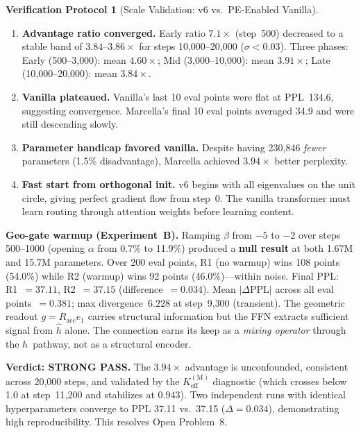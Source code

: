 \documentclass[11pt,a4paper]{article}
\theoremstyle{definition}
\newtheorem{protocol}[theorem]{Verification Protocol}
\theoremstyle{remark}
\begin{document}
\begin{protocol}[Scale Validation: v6 vs.\ PE-Enabled 
Vanilla]
\begin{enumerate}[label=(\roman*)]
    \item \textbf{Advantage ratio converged.} Early ratio $7.1\times$ 
    (step~500) decreased to a stable band of $3.84$--$3.86\times$ 
    for steps 10{,}000--20{,}000 ($\sigma < 0.03$). Three phases: 
    Early (500--3{,}000): mean $4.60\times$; Mid (3{,}000--10{,}000): 
    mean $3.91\times$; Late (10{,}000--20{,}000): mean $3.84\times$.
    
    \item \textbf{Vanilla plateaued.} Vanilla's last 10 eval points 
    were flat at PPL~134.6, suggesting convergence. Marcella's final 
    10 eval points averaged 34.9 and were still descending slowly.
    
    \item \textbf{Parameter handicap favored vanilla.} Despite having 
    230{,}846 \emph{fewer} parameters (1.5\% disadvantage), Marcella 
    achieved $3.94\times$ better perplexity.
    
    \item \textbf{Fast start from orthogonal init.} v6 begins 
    with all eigenvalues on the unit circle, giving perfect 
    gradient flow from step~0. The vanilla transformer must learn 
    routing through attention weights before learning content.
\end{enumerate}

\textbf{Geo-gate warmup (Experiment~B).} Ramping $\beta$ from 
$-5$ to $-2$ over steps 500--1000 (opening $\alpha$ from 0.7\% 
to 11.9\%) produced a \textbf{null result} at both 1.67M and 15.7M 
parameters. Over 200 eval points, R1 (no warmup) wins 108 points 
(54.0\%) while R2 (warmup) wins 92 points (46.0\%)---within noise.
Final PPL: R1~$= 37.11$, R2~$= 37.15$ (difference~$= 0.034$). Mean 
$|\Delta\mathrm{PPL}|$ across all eval points~$= 0.381$; max 
divergence~$6.228$ at step~9{,}300 (transient). The geometric readout 
$g = R_{\mathrm{acc}} e_1$ carries structural information but the FFN 
extracts sufficient signal from $\hat{h}$ alone. The connection earns 
its keep as a \emph{mixing operator} through the $h$~pathway, not as 
a structural encoder.

\textbf{Verdict: STRONG PASS.} The $3.94\times$ advantage is 
unconfounded, consistent across 20{,}000 steps, and validated by 
the $K_{\mathrm{eff}}^{(\mathrm{M})}$ diagnostic (which crosses below 
1.0 at step~11{,}200 and stabilizes at 0.943). Two independent runs 
with identical hyperparameters converge to PPL 37.11 vs.\ 37.15 
($\Delta = 0.034$), demonstrating high reproducibility. This resolves 
Open Problem~8.
\end{protocol}
\end{document}
